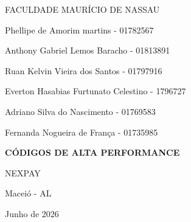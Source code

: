\documentclass{article}
\begin{document}
\fontsize{12pt}{18pt}\selectfont


\begin{titlepage}

\begin{center}

FACULDADE MAURÍCIO DE NASSAU

\vspace{2cm}

Phellipe de Amorim martins - 01782567

Anthony Gabriel Lemos Baracho - 01813891

Ruan Kelvin Vieira dos Santos - 01797916

Everton Hasabias Furtunato Celestino - 1796727

Adriano Silva do Nascimento - 01769583

Fernanda Nogueira de França - 01735985

\vfill

{\fontsize{16pt}{20pt}\selectfont\textbf{CÓDIGOS DE ALTA PERFORMANCE}}

\vspace{0.5cm}

NEXPAY

\vfill

Maceió - AL

Junho de 2026

\end{center}

\end{titlepage}

\end{document}
